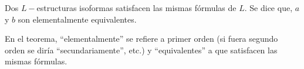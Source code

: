 \begin{theorem}
	Dos $L-$estructuras isoformas satisfacen las mismas fórmulas de $L$. Se dice que, $a$ y $b$ son elementalmente equivalentes.
\end{theorem}
En el teorema, ``elementalmente'' se refiere a primer orden (si fuera segundo orden se diría ``secundariamente'', etc.) y ``equivalentes'' a que satisfacen las mismas fórmulas.
